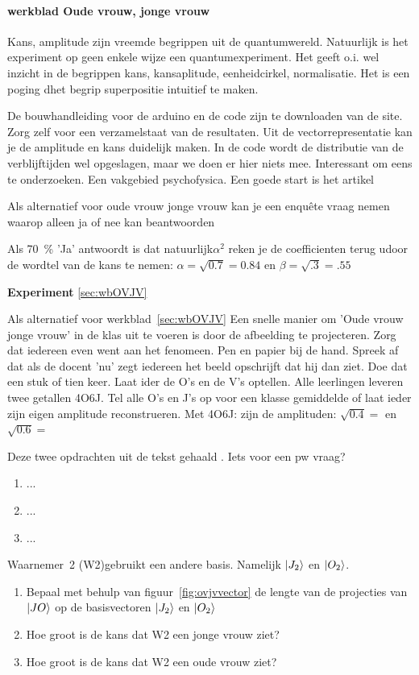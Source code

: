 \documentclass[../../main.tex]{subfiles}
\begin{document}
\paragraph{werkblad Oude vrouw, jonge vrouw}
Kans, amplitude zijn vreemde begrippen uit de quantumwereld. Natuurlijk is het  experiment op geen enkele wijze een quantumexperiment. Het geeft o.i. wel inzicht in de begrippen kans, kansaplitude, eenheidcirkel, normalisatie. Het is een poging dhet begrip superpositie intuitief te maken. 

De bouwhandleiding voor de arduino en de code zijn te downloaden van de site. Zorg zelf voor een verzamelstaat van de resultaten. Uit de vectorrepresentatie kan je de amplitude en kans duidelijk maken.
In de code wordt de distributie van de verblijftijden wel opgeslagen, maar we doen er hier niets mee. Interessant om eens te onderzoeken. Een vakgebied psychofysica. Een goede start is het artikel~\citep{kornmeier2012ambiguous} 

Als alternatief voor oude vrouw jonge vrouw kan je een enqu\^ete vraag nemen waarop alleen ja of nee kan beantwoorden

Als \SI{70}{\percent} 'Ja' antwoordt is dat natuurlijk$\alpha^2$ reken je de coefficienten terug udoor de wordtel van de kans te nemen:  $\alpha=\sqrt{0.7}=0.84$ en $\beta=\sqrt{.3}=.55 $

\textbf{Experiment} \ref{sec:wbOVJV}

Als alternatief voor werkblad~\ref{sec:wbOVJV}
Een snelle manier om 'Oude vrouw jonge vrouw' in de klas uit te voeren is door de afbeelding te projecteren. Zorg dat  iedereen even went aan het fenomeen. Pen en papier bij de hand. Spreek af dat als de docent 'nu' zegt iedereen het beeld opschrijft dat hij dan ziet. Doe dat een stuk of tien keer. Laat ider de O's  en de V's optellen. Alle leerlingen leveren twee getallen 4O6J. Tel alle O's en J's op voor een klasse gemiddelde of laat ieder zijn eigen amplitude reconstrueren. 
Met 4O6J: zijn de amplituden: $\sqrt{0.4}=$ en $\sqrt{0.6}=$ 

Deze twee opdrachten uit de tekst gehaald . Iets voor een  pw vraag?

\begin{antwoord}
\begin{enumerate}
\item ...
\item ...
\item ...
\end{enumerate}
\end{antwoord}
\begin{opdracht}\label{opd:JO1}%
Waarnemer~2 (W2)gebruikt een andere basis. Namelijk $\ket{J_2}$ en $\ket{O_2}$. 
\begin{enumerate}
\item Bepaal met behulp van figuur~\ref{fig:ovjvvector} de lengte van de projecties van $\ket{JO}$ op de basisvectoren $\ket{J_2}$ en $\ket{O_2}$
\item Hoe groot is de kans dat W2 een jonge vrouw ziet?
\item Hoe groot is de kans dat W2 een oude vrouw ziet?
\end{enumerate}
\end{opdracht}
\end{document}
